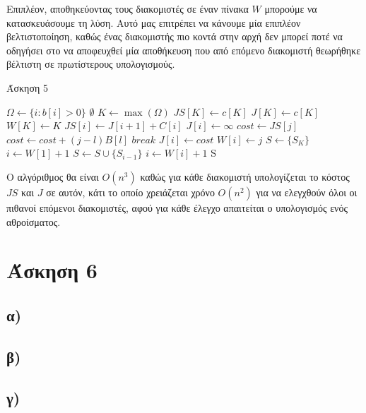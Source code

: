 \documentclass[11pt,a4paper]{book}
\begin{document}
Επιπλέον, αποθηκεύοντας τους διακομιστές σε έναν πίνακα $W$ μπορούμε να κατασκευάσουμε τη λύση. Αυτό μας επιτρέπει να κάνουμε μία επιπλέον βελτιστοποίηση, καθώς ένας διακομιστής πιο κοντά στην αρχή δεν μπορεί ποτέ να οδηγήσει στο να αποφευχθεί μία αποθήκευση που από επόμενο διακομιστή θεωρήθηκε βέλτιστη σε πρωτίστερους υπολογισμούς.

\begin{algorithm}[H]
\caption{\textgreek{Άσκηση 5}}
\begin{algorithmic}[1]
	\State $\Omega \gets \{ i: b[ i ] > 0 \}$
	\If {$\Omega = \emptyset$}
		\State \Return $\emptyset$
	\EndIf
	\State $K \gets \max( \Omega )$
	\State $JS[ K ] \gets c[ K ]$
	\State $J[ K ] \gets c[ K ]$
	\State $W[ K ] \gets K$
		\State $JS[ i ] \gets J[ i + 1 ] + C[ i ]$
		\State $J[ i ] \gets \infty$
			\State $cost \gets JS[ j ]$
				\State $cost \gets cost + ( j - l )B[ l ]$
					\State $break$
				\EndIf
			\EndFor
				\State $J[ i ] \gets cost$
				\State $W[ i ] \gets j$
			\EndIf
		\EndFor
	\EndFor
	\State $S \gets \{ S_K \}$
	\State $i \gets W[ 1 ] + 1$
		\State $S \gets S \cup \{ S_{i - 1} \}$
		\State $i \gets W[ i ] + 1$
	\EndWhile
	\State \Return S
\EndProcedure
\end{algorithmic}
\end{algorithm}

Ο αλγόριθμος θα είναι $O( n^3 )$ καθώς για κάθε διακομιστή υπολογίζεται το κόστος $JS$ και $J$ σε αυτόν, κάτι το οποίο χρειάζεται χρόνο $O( n^2 )$ για να ελεγχθούν όλοι οι πιθανοί επόμενοι διακομιστές, αφού για κάθε έλεγχο απαιτείται ο υπολογισμός ενός αθροίσματος.

\section*{Άσκηση 6}
\subsection*{α)}
\subsection*{β)}
\subsection*{γ)}
\end{document}
